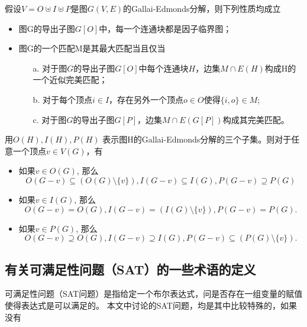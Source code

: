 \begin{lemma}
假设$V = O \uplus I \uplus P$是图$G(V, E)$的Gallai-Edmonds分解，则下列性质均成立
\begin{itemize}
  \item 图G的导出子图$G[O]$中，每一个连通块都是因子临界图；
  \item 图G的一个匹配M是其最大匹配当且仅当
        \begin{itemize}
          \item[a.]对于图$G$的导出子图$G[O]$中每个连通块$H$，边集$M \cap E(H)$构成H的一个近似完美匹配；
          \item[b.]对于每个顶点$i \in I$，存在另外一个顶点$o \in O$使得$\{i, o\} \in M$;
          \item[c.]对于图$G$的导出子图$G[P]$，边集$M \cap E(G[P])$构成其完美匹配。
        \end{itemize}
\end{itemize}
\end{lemma}

\begin{lemma} \label{stability lemma}
用$O(H), I(H), P(H)$ 表示图H的Gallai-Edmonds分解的三个子集。则对于任意一个顶点$v \in V(G)$，有
\begin{itemize}
\item 如果$v \in O(G)$, 那么\[O(G - v) \subseteq (O(G) \setminus \{ v \}), I(G - v) \subseteq I(G),P(G - v) \supseteq P(G)\]
\item 如果$v \in I(G)$, 那么\[O(G - v) = O(G), I(G - v) = (I(G) \setminus \{ v \}),P(G - v) = P(G).\]
\item 如果$v \in P(G)$, 那么\[O(G - v) \supseteq O(G), I(G - v) \supseteq I(G),P(G - v) \subseteq (P(G) \setminus \{ v \}).\]
\end{itemize}
\end{lemma}

\subsection{有关可满足性问题（SAT）的一些术语的定义}
可满足性问题（SAT问题）是指给定一个布尔表达式，问是否存在一组变量的赋值使得表达式是可以满足的。
本文中讨论的SAT问题，均是其中比较特殊的，如果没有

